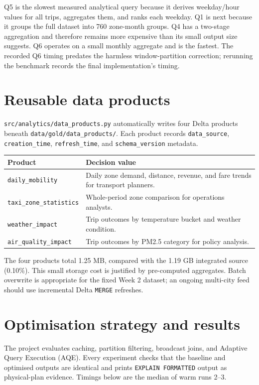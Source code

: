 \documentclass[11pt,a4paper]{article}
\begin{document}
Q5 is the slowest measured analytical query because it derives weekday/hour values for all trips, aggregates them, and ranks each weekday. Q1 is next because it groups the full dataset into 760 zone-month groups. Q4 has a two-stage aggregation and therefore remains more expensive than its small output size suggests. Q6 operates on a small monthly aggregate and is the fastest. The recorded Q6 timing predates the harmless window-partition correction; rerunning the benchmark records the final implementation's timing.

\section{Reusable data products}
\texttt{src/analytics/data\_products.py} automatically writes four Delta products beneath \texttt{data/gold/data\_products/}. Each product records \texttt{data\_source}, \texttt{creation\_time}, \texttt{refresh\_time}, and \texttt{schema\_version} metadata.

\begin{center}
\small
\begin{tabular}{p{3.6cm}p{10cm}}
\toprule
Product & Decision value \\
\midrule
\texttt{daily\_mobility} & Daily zone demand, distance, revenue, and fare trends for transport planners. \\
\texttt{taxi\_zone\_statistics} & Whole-period zone comparison for operations analysts. \\
\texttt{weather\_impact} & Trip outcomes by temperature bucket and weather condition. \\
\texttt{air\_quality\_impact} & Trip outcomes by PM2.5 category for policy analysis. \\
\bottomrule
\end{tabular}
\end{center}

The four products total 1.25 MB, compared with the 1.19 GB integrated source (0.10\%). This small storage cost is justified by pre-computed aggregates. Batch overwrite is appropriate for the fixed Week 2 dataset; an ongoing multi-city feed should use incremental Delta \texttt{MERGE} refreshes.

\section{Optimisation strategy and results}
The project evaluates caching, partition filtering, broadcast joins, and Adaptive Query Execution (AQE). Every experiment checks that the baseline and optimised outputs are identical and prints \texttt{EXPLAIN FORMATTED} output as physical-plan evidence. Timings below are the median of warm runs 2--3.
\end{document}
